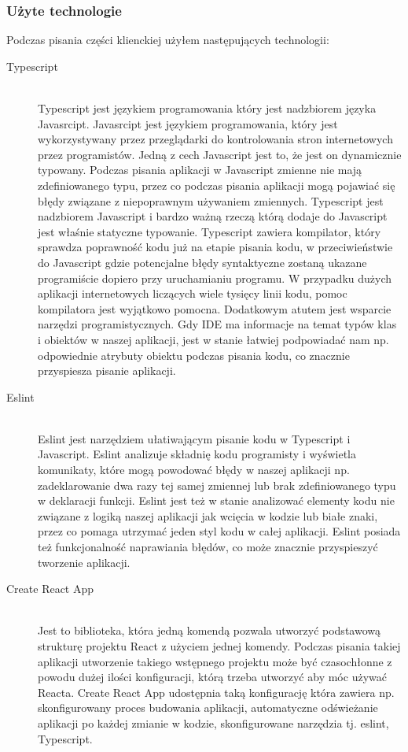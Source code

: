 \subsubsection{Użyte technologie}
Podczas pisania części klienckiej użyłem następujących technologii:
\begin{description}
  \item[Typescript] \hfill \\ Typescript jest językiem programowania który jest nadzbiorem języka Javasrcipt. Javasrcipt jest językiem programowania, który jest wykorzystywany przez przeglądarki do kontrolowania stron internetowych przez programistów. Jedną z cech Javascript jest to, że jest on dynamicznie typowany. Podczas pisania aplikacji w Javascript zmienne nie mają zdefiniowanego typu, przez co podczas pisania aplikacji mogą pojawiać się błędy związane z niepoprawnym używaniem zmiennych. Typescript jest nadzbiorem Javascript i bardzo ważną rzeczą którą dodaje do Javascript jest właśnie statyczne typowanie. Typescript zawiera kompilator, który sprawdza poprawność kodu już na etapie pisania kodu, w przeciwieństwie do Javascript gdzie potencjalne błędy syntaktyczne zostaną ukazane programiście dopiero przy uruchamianiu programu. W przypadku dużych aplikacji internetowych liczących wiele tysięcy linii kodu, pomoc kompilatora jest wyjątkowo pomocna. Dodatkowym atutem jest wsparcie narzędzi programistycznych. Gdy IDE ma informacje na temat typów klas i obiektów w naszej aplikacji, jest w stanie łatwiej podpowiadać nam np. odpowiednie atrybuty obiektu podczas pisania kodu, co znacznie przyspiesza pisanie aplikacji.
  \item[Eslint] \hfill \\ Eslint jest narzędziem ułatiwającym pisanie kodu w Typescript i Javascript. Eslint analizuje składnię kodu programisty i wyświetla komunikaty, które mogą powodować błędy w naszej aplikacji np. zadeklarowanie dwa razy tej samej zmiennej lub brak zdefiniowanego typu w deklaracji funkcji. Eslint jest też w stanie analizować elementy kodu nie związane z logiką naszej aplikacji jak wcięcia w kodzie lub białe znaki, przez co pomaga utrzymać jeden styl kodu w całej aplikacji. Eslint posiada też funkcjonalność naprawiania błędów, co może znacznie przyspieszyć tworzenie aplikacji.
  \item[Create React App] \hfill \\ Jest to biblioteka, która jedną komendą pozwala utworzyć podstawową strukturę projektu React z użyciem jednej komendy. Podczas pisania takiej aplikacji utworzenie takiego wstępnego projektu może być czasochłonne z powodu dużej ilości konfiguracji, którą trzeba utworzyć aby móc używać Reacta. Create React App udostępnia taką konfigurację która zawiera np. skonfigurowany proces budowania aplikacji, automatyczne odświeżanie aplikacji po każdej zmianie w kodzie, skonfigurowane narzędzia tj. eslint, Typescript.

\end{description}
